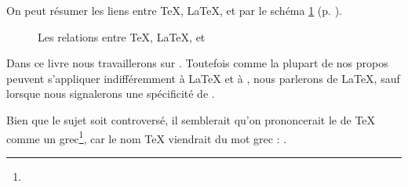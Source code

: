 On peut résumer les liens entre \TeX{}, \LaTeX{}, \XeTeX{} et \XeLaTeX{} par le schéma \ref{sch:tex} (p. \pageref{sch:tex}).

\begin{figure}[ht]
\centering

\caption{Les relations entre \TeX{}, \LaTeX{}, \XeTeX{} et \XeLaTeX{}}\label{sch:tex}
\end{figure} 

Dans  ce livre nous travaillerons sur \XeLaTeX{}. Toutefois comme la plupart de nos propos peuvent s'appliquer indifféremment  à \LaTeX{} et à \XeLaTeX{}, nous parlerons de \LaTeX{}, sauf lorsque nous signalerons une spécificité de \XeLaTeX{}.

\begin{anedocte}
Bien que le sujet soit controversé, il semblerait qu'on prononcerait le   de \TeX{} comme un  grec\footnote{}, car le nom \TeX{} viendrait du mot grec  : .
\end{anedocte}
